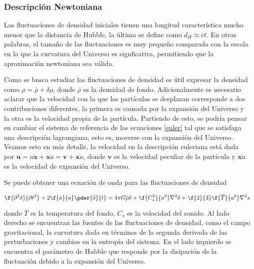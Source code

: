 \documentclass[a4,useAMS,usenatbib,usegraphicx,12pt]{article}
\begin{document}
\subsubsection*{Descripción Newtoniana}

Las fluctuaciones de densidad iniciales tienen una longitud característica mucho menor 
que la distancia de Hubble, la última se define como $d_H \approx ct$. En otras palabras,
el tamaño de las fluctuaciones es muy pequeño comparada con la escala en la que la 
curvatura del Universo es signficativa, permitiendo que la aproximación newtoniana sea válida. 


Como se busca estudiar las fluctuaciones de densidad es útil expresar la 
densidad como $\rho = \overline{\rho}+\delta\rho$, donde $\overline{\rho}$
es la densidad de fondo. Adicionalmente es necesario aclarar que la velocidad 
con la que las partículas se desplazan corresponde a dos contribuciones diferentes, 
la primera es causada por la expansión del Universo y la 
otra es la velocidad propia de la partícula. Partiendo de esto, se
podría pensar en cambiar el sistema de referencia
de las ecuaciones \ref{euler} tal que se satisfaga una descripción lagrangiana, 
esto es, moverse con la expansión del Universo. 
Veamos esto en más detalle, la velocidad en la descripción euleriana está dada 
por $\textbf{u}= a\dot{\textbf{x}}+
\textbf{x}\dot{a} = \textbf{v}+\textbf{x}\dot{a}$, donde $\textbf{v}$ es la velocidad 
peculiar de la partícula y $\textbf{x}\dot{a}$ es la velocidad de expansión del Universo.

Se puede obtener una ecuación de onda para las fluctuaciones de densidad 

\begin{equation}
\f{\partial^2\delta}{\partial t^2}+2\f{\dot{a}}{a}\pder{\delta}{t} =
4\pi G \overline{\rho}\delta + \f{C_s^2}{a^2}\nabla^2\delta+\f{2}{3}\f{\overline{T}}{a^2}\nabla^2s
\label{onda}
\end{equation}

donde $\overline{T}$ es la temperatura del fondo, $C_s$ es la velocidad del sonido. 
Al lado derecho se encuentran las fuentes de las 
fluctuaciones de densidad, como el campo gravitacional, la curvatura dada en términos de la segunda 
derivada de las perturbaciones y cambios en la entropía del sistema. En el lado izquierdo 
se encuentra el parámetro de Hubble que responde por la disipación de la fluctuación debido 
a la expansión del Universo. 
\end{document}
